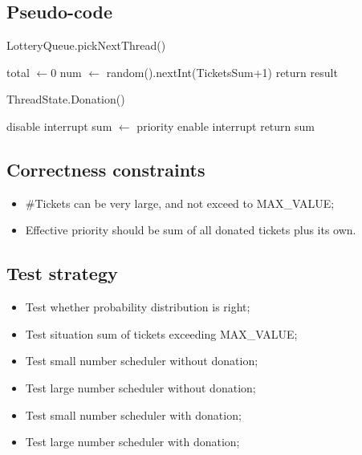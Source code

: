 \documentclass[a4paper,10pt]{article}
\begin{document}
\subsection{Pseudo-code}
%
%
\begin{algorithm}
\caption{LotteryQueue.pickNextThread()}
total $\leftarrow 0$\;
num $\leftarrow$ random().nextInt(TicketsSum+1)\;
return result\;
\end{algorithm}

\begin{algorithm}
\caption{ThreadState.Donation()}
disable interrupt\;
sum $\leftarrow$ priority\;
enable interrupt\;
return sum\;
\end{algorithm}
\subsection{Correctness constraints}
\begin{itemize}
\item \#Tickets can be very large, and not exceed to MAX\_VALUE;
\item Effective priority should be sum of all donated tickets plus its own.
\end{itemize}

\subsection{Test strategy}
\begin{itemize}
\item Test whether probability distribution is right;
\item Test situation sum of tickets exceeding MAX\_VALUE;
\item Test small number scheduler without donation;
\item Test large number scheduler without donation;
\item Test small number scheduler with donation;
\item Test large number scheduler with donation;
\end{itemize}
\end{document}
